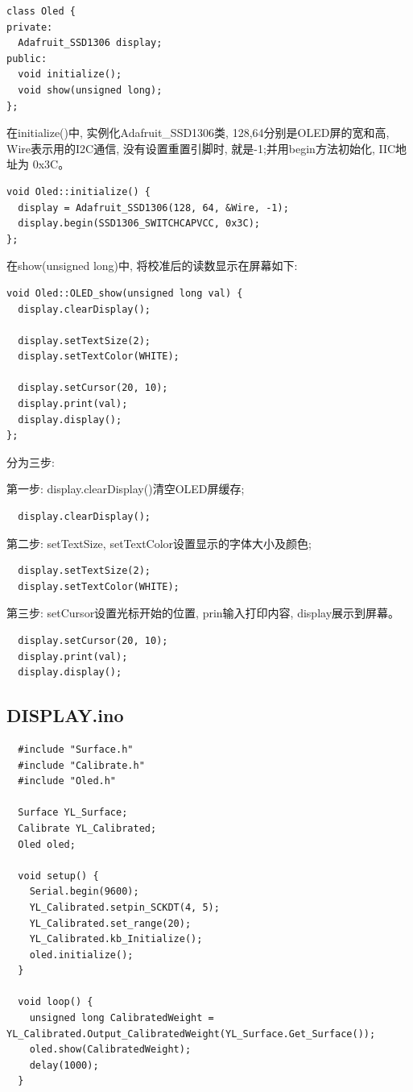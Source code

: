 \documentclass{article}
\begin{document}
\begin{lstlisting}
class Oled {
private:
  Adafruit_SSD1306 display;
public:
  void initialize();
  void show(unsigned long);
};
\end{lstlisting}

在initialize()中, 实例化Adafruit\_SSD1306类, 128,64分别是OLED屏的宽和高, Wire表示用的I2C通信, 没有设置重置引脚时, 就是-1;并用begin方法初始化,
IIC地址为 0x3C。
\begin{lstlisting}
void Oled::initialize() {
  display = Adafruit_SSD1306(128, 64, &Wire, -1);
  display.begin(SSD1306_SWITCHCAPVCC, 0x3C);
};
\end{lstlisting}

在show(unsigned long)中, 将校准后的读数显示在屏幕如下:
\begin{lstlisting}
void Oled::OLED_show(unsigned long val) {
  display.clearDisplay();

  display.setTextSize(2);
  display.setTextColor(WHITE);

  display.setCursor(20, 10);
  display.print(val);
  display.display();  
};
\end{lstlisting}
分为三步:

\noindent 第一步: display.clearDisplay()清空OLED屏缓存;
\begin{lstlisting}
  display.clearDisplay();
\end{lstlisting}
第二步: setTextSize, setTextColor设置显示的字体大小及颜色;
\begin{lstlisting}
  display.setTextSize(2);
  display.setTextColor(WHITE);  
\end{lstlisting}
第三步: setCursor设置光标开始的位置, prin输入打印内容, display展示到屏幕。
\begin{lstlisting}
  display.setCursor(20, 10);
  display.print(val);
  display.display();  
\end{lstlisting}

\subsection{DISPLAY.ino}
\begin{lstlisting}
  #include "Surface.h"
  #include "Calibrate.h"
  #include "Oled.h"
  
  Surface YL_Surface;
  Calibrate YL_Calibrated;
  Oled oled;
  
  void setup() {
    Serial.begin(9600);
    YL_Calibrated.setpin_SCKDT(4, 5);
    YL_Calibrated.set_range(20);
    YL_Calibrated.kb_Initialize();  
    oled.initialize();
  }
  
  void loop() {
    unsigned long CalibratedWeight = YL_Calibrated.Output_CalibratedWeight(YL_Surface.Get_Surface());
    oled.show(CalibratedWeight);
    delay(1000);
  }  
\end{lstlisting}
\end{document}
